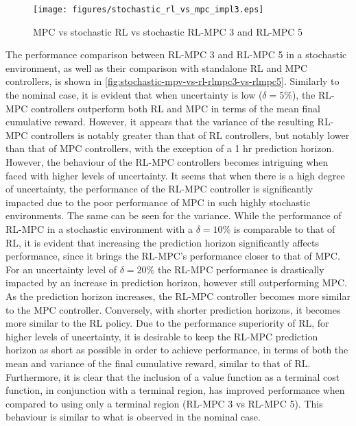 \begin{figure}[H]
	\centering
	\texttt{[image: figures/stochastic\_rl\_vs\_mpc\_impl3.eps]}
	\caption{MPC vs stochastic RL vs stochastic RL-MPC 3 and RL-MPC 5}
	\label{fig:stochastic-mpv-vs-rl-rlmpc3-vs-rlmpc5}
\end{figure}
The performance comparison between RL-MPC 3 and RL-MPC 5 in a stochastic environment, as well as their comparison with standalone RL and MPC controllers, is shown in \autoref{fig:stochastic-mpv-vs-rl-rlmpc3-vs-rlmpc5}. Similarly to the nominal case, it is evident that when uncertainty is low ($\delta = 5\%$), the RL-MPC controllers outperform both RL and MPC in terms of the mean final cumulative reward. However, it appears that the variance of the resulting RL-MPC controllers is notably greater than that of RL controllers, but notably lower than that of MPC controllers, with the exception of a 1 hr prediction horizon. 
However, the behaviour of the RL-MPC controllers becomes intriguing when faced with higher levels of uncertainty. It seems that when there is a high degree of uncertainty, the performance of the RL-MPC controller is significantly impacted due to the poor performance of MPC in such highly stochastic environments. The same can be seen for the variance. While the performance of RL-MPC in a stochastic environment with a $\delta = 10\%$  is comparable to that of RL, it is evident that increasing the prediction horizon significantly affects performance, since it brings the RL-MPC's performance closer to that of MPC. For an uncertainty level of $\delta = 20\%$ the RL-MPC performance is drastically impacted by an increase in prediction horizon, however still outperforming MPC. As the prediction horizon increases, the RL-MPC controller becomes more similar to the MPC controller. Conversely, with shorter prediction horizons, it becomes more similar to the RL policy. Due to the performance superiority of RL, for higher levels of uncertainty, it is desirable to keep the RL-MPC prediction horizon as short as possible in order to achieve performance, in terms of both the mean and variance of the final cumulative reward, similar to that of RL. Furthermore, it is clear that the inclusion of a value function as a terminal cost function, in conjunction with a terminal region, has improved performance when compared to using only a terminal region (RL-MPC 3 vs RL-MPC 5). This behaviour is similar to what is observed in the nominal case.


